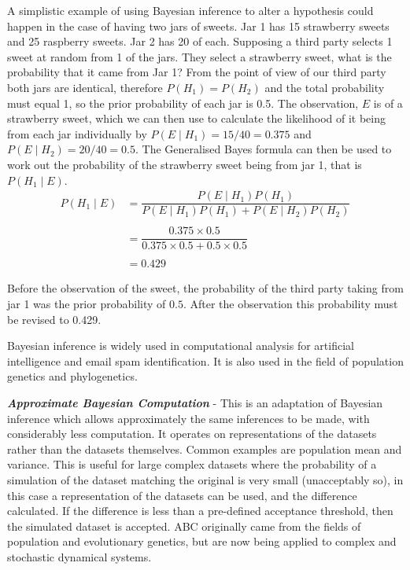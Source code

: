 A simplistic example of using Bayesian inference to alter a hypothesis could happen in the case of having two jars of sweets. Jar 1 has 15 strawberry sweets and 25 raspberry sweets. Jar 2 has 20 of each. Supposing a third party selects 1 sweet at random from 1 of the jars. They select a strawberry sweet, what is the probability that it came from Jar 1? From the point of view of our third party both jars are identical, therefore $P(H_1) = P(H_2)$ and the total probability must equal 1, so the prior probability of each jar is 0.5. The observation, $E$ is of a strawberry sweet, which we can then use to calculate the likelihood of it being from each jar individually by $P(E\mid H_1) = 15/40 = 0.375$ and $P(E\mid H_2) = 20/40 = 0.5$.
The Generalised Bayes formula can then be used to work out the probability of the strawberry sweet being from jar 1, that is $P(H_1\mid E)$.\\
\begin{align}
\nonumber
P(H_1\mid E) & = \dfrac{P(E\mid H_1)P(H_1)}{P(E\mid H_1)P(H_1) + P(E\mid H_2)P(H_2)}\\
\nonumber \\
\nonumber
& = \dfrac{0.375 \times 0.5}{0.375 \times 0.5 + 0.5 \times 0.5}\\
\nonumber \\
& = 0.429
\end{align}

Before the observation of the sweet, the probability of the third party taking from jar 1 was the prior probability of $0.5$. After the observation this probability must be revised to 0.429.

Bayesian inference is widely used in computational analysis for artificial intelligence and email spam identification. It is also used in the field of population genetics and phylogenetics\cite{Ronquist2011}.

\textbf{\textit{Approximate Bayesian Computation}} - This is an adaptation of Bayesian inference which allows approximately the same inferences to be made, with considerably less computation. It operates on representations of the datasets rather than the datasets themselves. Common examples are population mean and variance. This is useful for large complex datasets where the probability of a simulation of the dataset matching the original is very small (unacceptably so), in this case a representation of the datasets can be used, and the difference calculated. If the difference is less than a pre-defined acceptance threshold, then the simulated dataset is accepted. ABC originally came from the fields of population and evolutionary genetics\cite{Beaumont2002}, but are now being applied to complex and stochastic dynamical systems\cite{Sisson2007,Toni2009,Beaumont2010}.

